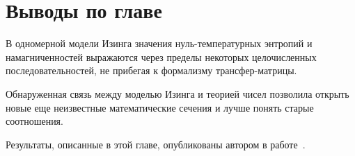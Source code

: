 \section{Выводы по главе}

В одномерной модели Изинга значения нуль-температурных энтропий и намагниченностей выражаются через пределы некоторых целочисленных последовательностей, не  прибегая к формализму трансфер-матрицы.

Обнаруженная связь между моделью Изинга и теорией чисел позволила открыть новые еще неизвестные математические сечения и лучше понять старые соотношения.

Результаты, описанные в этой главе, опубликованы автором в работе~\cite{vakbib3}.

\FloatBarrier